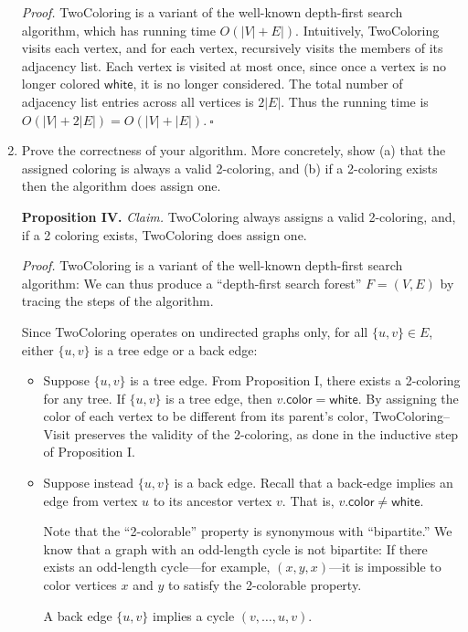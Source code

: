 \begin{enumerate}
\begin{solution}
\textit{Proof. }{\sc TwoColoring} is a variant of the well-known depth-first search algorithm, which has running time $O(|V|+E|)$. Intuitively, {\sc TwoColoring} visits each vertex, and for each vertex, recursively visits the members of its adjacency list. Each vertex is visited at most once, since once a vertex is no longer colored $\mathsf{white}$, it is no longer considered. The total number of adjacency list entries across all vertices is $2|E|$. Thus the running time is $O(|V|+2|E|)=O(|V|+|E|).~\square$
\end{solution}
\newpage
\item Prove the correctness of your algorithm. More concretely, show (a) that the assigned coloring is always a valid 2-coloring, and (b) if a 2-coloring exists then the algorithm does assign one.
\begin{solution}
\textbf{Proposition IV. }\textit{Claim. }{\sc TwoColoring} always assigns a valid 2-coloring, and, if a 2 coloring exists, {\sc TwoColoring} does assign one.

\textit{Proof. }{\sc TwoColoring} is a variant of the well-known depth-first search algorithm: We can thus produce a ``depth-first search forest'' $F=(V,E)$ by tracing the steps of the algorithm.

Since {\sc TwoColoring} operates on undirected graphs only, for all $\{u,v\}\in E$, either $\{u,v\}$ is a tree edge or a back edge:
\begin{itemize}
    \item Suppose $\{u,v\}$ is a tree edge. From Proposition I, there exists a 2-coloring for any tree. If $\{u,v\}$ is a tree edge, then $v.\mathsf{color}=\mathsf{white}$. By assigning the color of each vertex to be different from its parent's color, {\sc TwoColoring--Visit} preserves the validity of the 2-coloring, as done in the inductive step of Proposition I.
    \item Suppose instead $\{u,v\}$ is a back edge. Recall that a back-edge implies an edge from vertex $u$ to its ancestor vertex $v$. That is, $v.\mathsf{color}\neq\mathsf{white}$.
    
    Note that the ``2-colorable'' property is synonymous with ``bipartite.'' We know that a graph with an odd-length cycle is not bipartite: If there exists an odd-length cycle---for example, $(x,y,x)$---it is impossible to color vertices $x$ and $y$ to satisfy the 2-colorable property.
    
    A back edge $\{u,v\}$ implies a cycle $(v,\dots,u,v)$.
    

\end{itemize}
\end{solution}
\end{enumerate}
